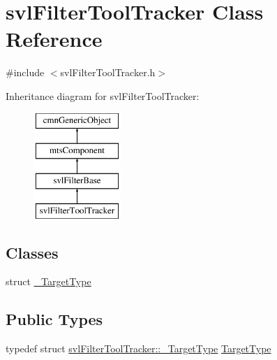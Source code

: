 \hypertarget{classsvl_filter_tool_tracker}{}\section{svl\+Filter\+Tool\+Tracker Class Reference}
\label{classsvl_filter_tool_tracker}


{\ttfamily \#include $<$svl\+Filter\+Tool\+Tracker.\+h$>$}

Inheritance diagram for svl\+Filter\+Tool\+Tracker\+:\begin{figure}[H]
\begin{center}
\leavevmode
\includegraphics[height=4.000000cm]{d5/d28/classsvl_filter_tool_tracker}
\end{center}
\end{figure}
\subsection*{Classes}
\begin{DoxyCompactItemize}
\item 
struct \hyperlink{structsvl_filter_tool_tracker_1_1___target_type}{\+\_\+\+Target\+Type}
\end{DoxyCompactItemize}
\subsection*{Public Types}
\begin{DoxyCompactItemize}
\item 
typedef struct \hyperlink{structsvl_filter_tool_tracker_1_1___target_type}{svl\+Filter\+Tool\+Tracker\+::\+\_\+\+Target\+Type} \hyperlink{classsvl_filter_tool_tracker_a3fe48b9f9a53caf0f5df9e96b1ccc38e}{Target\+Type}
\end{DoxyCompactItemize}
